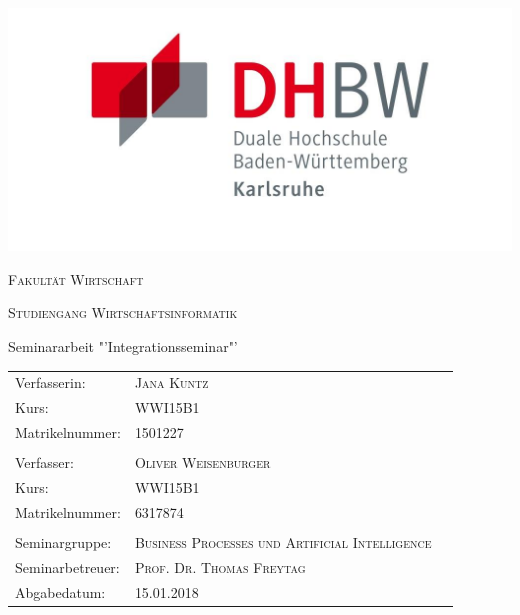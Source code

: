 \begin{titlepage}
	\centering
	
	\includegraphics{pictures/dhbw_logo.png}
	\vspace{1cm}
	\par
	{\scshape\LARGE Fakultät Wirtschaft\par}
	\vspace{0.2cm}
	{\scshape\Large Studiengang Wirtschaftsinformatik\par}
	\vspace{1cm}
	{\Large Seminararbeit "'Integrationsseminar"'\par}
	\vspace{1cm}
	
{\large\bfseries \ThesisTitle \par}
	\vfill
	
	\begin{center}
	\begin{tabularx}{\columnwidth}{XXl}
	Verfasserin: &  \textsc{Jana Kuntz}\\
	Kurs: & \textsc{WWI15B1} \\
	Matrikelnummer: & \textsc{1501227} \\\\
	Verfasser: & \textsc{Oliver Weisenburger} \\
	Kurs: & \textsc{WWI15B1} \\
	Matrikelnummer: & \textsc{6317874} \\\\
	Seminargruppe:&  \textsc{Business Processes und Artificial 			Intelligence} 	 \\
	Seminarbetreuer: &  \textsc{Prof. Dr. Thomas Freytag} 	\\
	
	Abgabedatum: & \textsc{15.01.2018} \\
\end{tabularx} 
 \end{center}

\end{titlepage}
